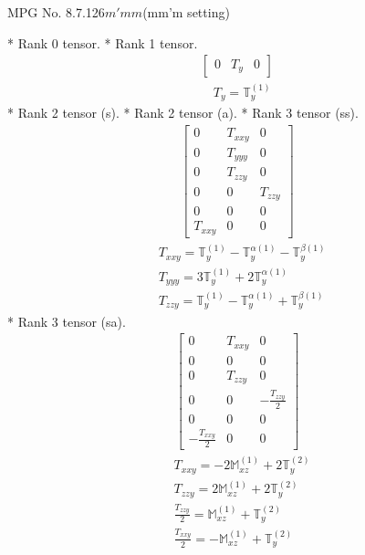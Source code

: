 \documentclass[fleqn,8pt,landscape]{jsarticle}
\begin{document}
\setcounter{MaxMatrixCols}{32}

\renewcommand{\tablename}{Table~}
\renewcommand{\figurename}{Figure~}
\begin{center}
\LARGE
MPG No. 8.7.126\quad$m'mm$\quad(mm'm setting)
\end{center}
* Rank 0 tensor.
* Rank 1 tensor.
\begin{align*}
\begin{bmatrix} 0 & T_{y} & 0 \end{bmatrix}
\end{align*}
\begin{align*}
& T_{y} = \mathbb{T}_{y}^{(1)}
\end{align*}
* Rank 2 tensor (s).
* Rank 2 tensor (a).
* Rank 3 tensor (ss).
\begin{align*}
\begin{bmatrix} 0 & T_{xxy} & 0 \\ 0 & T_{yyy} & 0 \\ 0 & T_{zzy} & 0 \\ 0 & 0 & T_{zzy} \\ 0 & 0 & 0 \\ T_{xxy} & 0 & 0 \end{bmatrix}
\end{align*}
\begin{align*}
& T_{xxy} = \mathbb{T}_{y}^{(1)} - \mathbb{T}_{y}^{\alpha(1)} - \mathbb{T}_{y}^{\beta(1)} \\
& T_{yyy} = 3 \mathbb{T}_{y}^{(1)} + 2 \mathbb{T}_{y}^{\alpha(1)} \\
& T_{zzy} = \mathbb{T}_{y}^{(1)} - \mathbb{T}_{y}^{\alpha(1)} + \mathbb{T}_{y}^{\beta(1)}
\end{align*}
* Rank 3 tensor (sa).
\begin{align*}
\begin{bmatrix} 0 & T_{xxy} & 0 \\ 0 & 0 & 0 \\ 0 & T_{zzy} & 0 \\ 0 & 0 & - \frac{T_{zzy}}{2} \\ 0 & 0 & 0 \\ - \frac{T_{xxy}}{2} & 0 & 0 \end{bmatrix}
\end{align*}
\begin{align*}
& T_{xxy} = - 2 \mathbb{M}_{xz}^{(1)} + 2 \mathbb{T}_{y}^{(2)} \\
& T_{zzy} = 2 \mathbb{M}_{xz}^{(1)} + 2 \mathbb{T}_{y}^{(2)} \\
& \frac{T_{zzy}}{2} = \mathbb{M}_{xz}^{(1)} + \mathbb{T}_{y}^{(2)} \\
& \frac{T_{xxy}}{2} = - \mathbb{M}_{xz}^{(1)} + \mathbb{T}_{y}^{(2)}
\end{align*}
\end{document}
